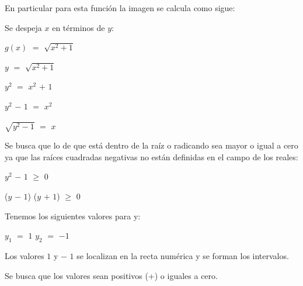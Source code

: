\documentclass[12pt]{article}
\newenvironment{MyColorPar}[1]{%
    \leavevmode\color{#1}\ignorespaces%
}{%
}%
\begin{document}
\begin{MyColorPar}{Cinnabar} \bfseries{
{} 
En particular para esta función la imagen se calcula como sigue: \vspace{0.5cm}

Se despeja $x$ en términos de $y$: \vspace{0.5cm}

\hspace{4cm}  $g(x)$ $=$ $\sqrt{x^{2}+1}$ \vspace{0.5cm}

\hspace{4.6cm}  $y$ $=$ $\sqrt{x^{2}+1}$ \vspace{0.5cm}

\hspace{4.4cm}  $y^{2}$ $=$ $x^{2}$ $+$ $1$ \vspace{0.5cm}

\hspace{3.4cm}  $y^{2}$ $-$ $1$ $=$ $x^{2}$  \vspace{0.5cm}

\hspace{3cm}  $\sqrt{y^{2} - 1}$ $=$ $x$  \vspace{0.5cm}

Se busca que lo de que está dentro de la raíz o radicando sea mayor o igual a cero ya que las raíces cuadradas negativas no están definidas en el campo de los reales:\vspace{0.5cm}

\hspace{4cm} $y^{2}$ $-$ $1$ $\geq$ $0$ \vspace{0.5cm}

\hspace{4cm} ($y$ $-$ $1$) ($y$ $+$ $1$) $\geq$ $0$ \vspace{0.5cm}

Tenemos los siguientes valores para y: \vspace{0.5cm}

\hspace{4cm} $y_{1}$ $=$ $1$ $y_{2}$ $=$ $-1$ \vspace{0.5cm}

Los valores $1$ y $-$ $1$ se localizan en la recta numérica y se forman los intervalos. \vspace{0.5cm}

Se busca que los valores sean {\textcolor{verde_manzana}{positivos (+)}} o iguales a {\textcolor{Tarawera}{cero}}. \vspace{0.5cm}

}
\end{MyColorPar}
\end{document}
